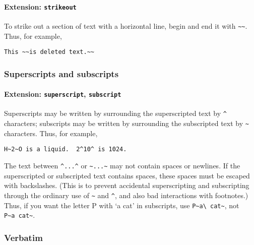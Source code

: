 \hypertarget{extension-strikeout}{%
\paragraph{\texorpdfstring{Extension:
\texttt{strikeout}}{Extension: strikeout}}\label{extension-strikeout}}

To strike out a section of text with a horizontal line, begin and end it
with \texttt{\textasciitilde{}\textasciitilde{}}. Thus, for example,

\begin{verbatim}
This ~~is deleted text.~~
\end{verbatim}

\hypertarget{superscripts-and-subscripts}{%
\subsubsection{Superscripts and
subscripts}\label{superscripts-and-subscripts}}

\hypertarget{extension-superscript-subscript}{%
\paragraph{\texorpdfstring{Extension: \texttt{superscript},
\texttt{subscript}}{Extension: superscript, subscript}}\label{extension-superscript-subscript}}

Superscripts may be written by surrounding the superscripted text by
\texttt{\^{}} characters; subscripts may be written by surrounding the
subscripted text by \texttt{\textasciitilde{}} characters. Thus, for
example,

\begin{verbatim}
H~2~O is a liquid.  2^10^ is 1024.
\end{verbatim}

The text between \texttt{\^{}...\^{}} or
\texttt{\textasciitilde{}...\textasciitilde{}} may not contain spaces or
newlines. If the superscripted or subscripted text contains spaces,
these spaces must be escaped with backslashes. (This is to prevent
accidental superscripting and subscripting through the ordinary use of
\texttt{\textasciitilde{}} and \texttt{\^{}}, and also bad interactions
with footnotes.) Thus, if you want the letter P with `a cat' in
subscripts, use
\texttt{P\textasciitilde{}a\textbackslash{}\ cat\textasciitilde{}}, not
\texttt{P\textasciitilde{}a\ cat\textasciitilde{}}.

\hypertarget{verbatim}{%
\subsubsection{Verbatim}\label{verbatim}}

